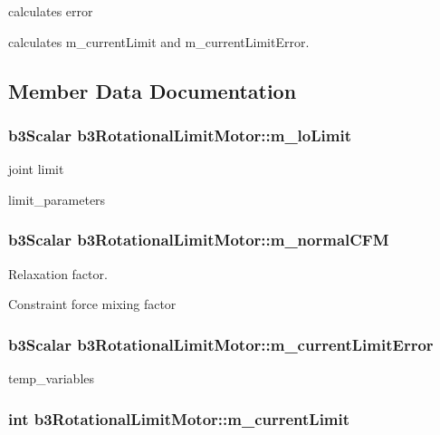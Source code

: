 calculates error 

calculates m\_\-currentLimit and m\_\-currentLimitError. 

\subsection{Member Data Documentation}
\hypertarget{classb3_rotational_limit_motor_1ec51980cf1c20f39290b10f971ef378}{
\subsubsection[m\_\-loLimit]{\setlength{\rightskip}{0pt plus 5cm}b3Scalar {\bf b3RotationalLimitMotor::m\_\-loLimit}}}
\label{classb3_rotational_limit_motor_1ec51980cf1c20f39290b10f971ef378}


joint limit 

limit\_\-parameters \hypertarget{classb3_rotational_limit_motor_bf008f6f2ecc5a97eed73825db97678e}{
\subsubsection[m\_\-normalCFM]{\setlength{\rightskip}{0pt plus 5cm}b3Scalar {\bf b3RotationalLimitMotor::m\_\-normalCFM}}}
\label{classb3_rotational_limit_motor_bf008f6f2ecc5a97eed73825db97678e}


Relaxation factor. 

Constraint force mixing factor \hypertarget{classb3_rotational_limit_motor_63167fcd92370cd81b058b9013aa2342}{
\subsubsection[m\_\-currentLimitError]{\setlength{\rightskip}{0pt plus 5cm}b3Scalar {\bf b3RotationalLimitMotor::m\_\-currentLimitError}}}
\label{classb3_rotational_limit_motor_63167fcd92370cd81b058b9013aa2342}


temp\_\-variables \hypertarget{classb3_rotational_limit_motor_04210dff8941deee039e6c290a50f301}{
\subsubsection[m\_\-currentLimit]{\setlength{\rightskip}{0pt plus 5cm}int {\bf b3RotationalLimitMotor::m\_\-currentLimit}}}
\label{classb3_rotational_limit_motor_04210dff8941deee039e6c290a50f301}


